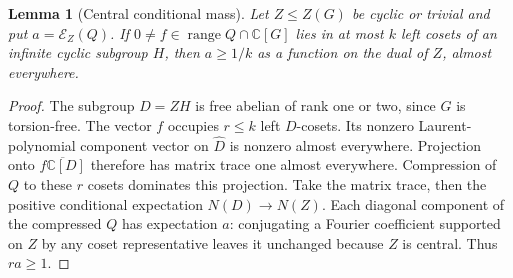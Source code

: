 \documentclass[11pt,a4paper,oneside]{report}
\newtheorem{lemma}[theorem]{Lemma}
\theoremstyle{definition}
\theoremstyle{remark}
\newcommand{\C}{\mathbb C}
\begin{document}
\begin{lemma}[Central conditional mass]\label{M09:lem:conditional}
Let $Z\le Z(G)$ be cyclic or trivial and put $a=\mathcal E_Z(Q)$.
If $0\ne f\in\operatorname{range}Q\cap\C[G]$ lies in at most
$k$ left cosets of an infinite cyclic subgroup $H$, then
$a\ge1/k$ as a function on the dual of $Z$, almost everywhere.
\end{lemma}
\begin{proof}
The subgroup $D=ZH$ is free abelian of rank one or two, since
$G$ is torsion-free. The vector $f$ occupies $r\le k$ left
$D$-cosets. Its nonzero Laurent-polynomial component vector on
$\widehat D$ is nonzero almost everywhere. Projection onto
$\overline{f\C[D]}$ therefore has matrix trace one almost
everywhere. Compression of $Q$ to these $r$ cosets dominates
this projection. Take the matrix trace, then the positive
conditional expectation $N(D)\to N(Z)$. Each diagonal component
of the compressed $Q$ has expectation $a$: conjugating a Fourier
coefficient supported on $Z$ by any coset representative leaves
it unchanged because $Z$ is central. Thus $ra\ge1$.
\end{proof}
\end{document}
